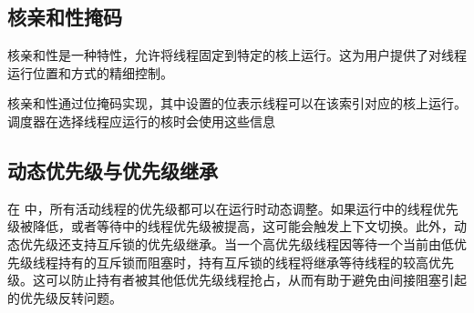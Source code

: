 
\subsection{核亲和性掩码}

核亲和性是一种特性，允许将线程固定到特定的核上运行。这为用户提供了对线程运行位置和方式的精细控制。

核亲和性通过位掩码实现，其中设置的位表示线程可以在该索引对应的核上运行。调度器在选择线程应运行的核时会使用这些信息



\subsection{动态优先级与优先级继承}

在 \OSname{} 中，所有活动线程的优先级都可以在运行时动态调整。如果运行中的线程优先级被降低，或者等待中的线程优先级被提高，这可能会触发上下文切换。此外，动态优先级还支持互斥锁的优先级继承。当一个高优先级线程因等待一个当前由低优先级线程持有的互斥锁而阻塞时，持有互斥锁的线程将继承等待线程的较高优先级。这可以防止持有者被其他低优先级线程抢占，从而有助于避免由间接阻塞引起的优先级反转问题。


